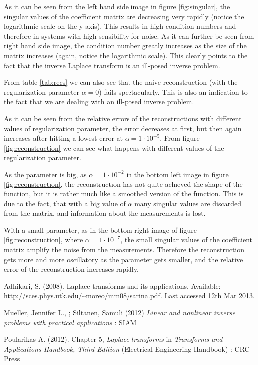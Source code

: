 \documentclass[12pt,a4]{article}
\begin{document}
As it can be seen from the left hand side image in figure \ref{fig:singular}, the singular values of the coefficient matrix are decreasing very rapidly (notice the logarithmic scale on the y-axis). This results in high condition numbers and therefore in systems with high sensibility for noise. As it can further be seen from right hand side image, the condition number greatly increases as the size of the matrix increases (again, notice the logarithmic scale). This clearly points to the fact that the inverse Laplace transform is an ill-posed inverse problem.

From table \ref{tab:recs} we can also see that the naive reconstruction (with the regularization parameter $\alpha = 0$) fails spectacularly. This is also an indication to the fact that we are dealing with an ill-posed inverse problem.

As it can be seen from the relative errors of the reconstructions with different values of regularization parameter, the error decreases at first, but then again increases after hitting a lowest error at $\alpha = 1 \cdot 10^{-5}$. From figure \ref{fig:reconstruction} we can see what happens with different values of the regularization parameter.

As the parameter is big, as $\alpha = 1 \cdot 10^{-2}$ in the bottom left image in figure \ref{fig:reconstruction}, the reconstruction has not quite achieved the shape of the function, but it is rather much like a smoothed version of the function. This is due to the fact, that with a big value of $\alpha$ many singular values are discarded from the matrix, and information about the measurements is lost.

With a small parameter, as in the bottom right image of figure \ref{fig:reconstruction}, where $\alpha = 1 \cdot 10^{-7}$, the small singular values of the coefficient matrix amplify the noise from the measurements. Therefore the reconstruction gets more and more oscillatory as the parameter gets smaller, and the relative error of the reconstruction increases rapidly.



\newpage
\begin{thebibliography}{9}

Adhikari, S. (2008). Laplace transforms and its applications. Available: \url{http://sces.phys.utk.edu/~moreo/mm08/sarina.pdf}. Last accessed 12th Mar 2013.

Mueller, Jennifer L., ; Siltanen, Samuli (2012)
\emph{Linear and nonlinear inverse problems with practical applications} : SIAM

Poularikas A. (2012). Chapter 5, \emph{Laplace transforms} in \emph{Transforms and Applications Handbook, Third Edition} (Electrical Engineering Handbook) : CRC Press


\end{thebibliography}
\end{document}
